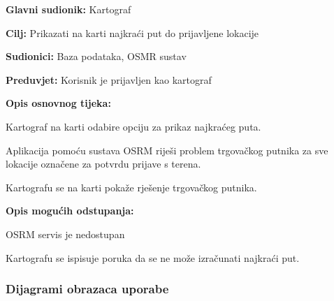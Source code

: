 				\noindent {}
				\begin{packed_item}
					
					\item \textbf{Glavni sudionik: }Kartograf
					\item  \textbf{Cilj:} Prikazati na karti najkraći put do prijavljene lokacije
					\item  \textbf{Sudionici:} Baza podataka, OSMR sustav
					\item  \textbf{Preduvjet:} Korisnik je prijavljen kao kartograf
					\item  \textbf{Opis osnovnog tijeka:}
					
					\item[] \begin{packed_enum}
						
						\item Kartograf na karti odabire opciju za prikaz najkraćeg puta.
						\item Aplikacija pomoću sustava OSRM riješi problem trgovačkog putnika za sve lokacije označene za potvrdu prijave s terena.
						\item Kartografu se na karti pokaže rješenje trgovačkog putnika.
					\end{packed_enum}
					
					\item  \textbf{Opis mogućih odstupanja:}
					
					\item[] \begin{packed_item}
						
						\item[2.a] OSRM servis je nedostupan
						\item[] \begin{packed_enum}
							
							\item Kartografu se ispisuje poruka da se ne može izračunati najkraći put.
							
						\end{packed_enum}
						
					\end{packed_item}
				\end{packed_item}
					
				\subsubsection{Dijagrami obrazaca uporabe}
					
